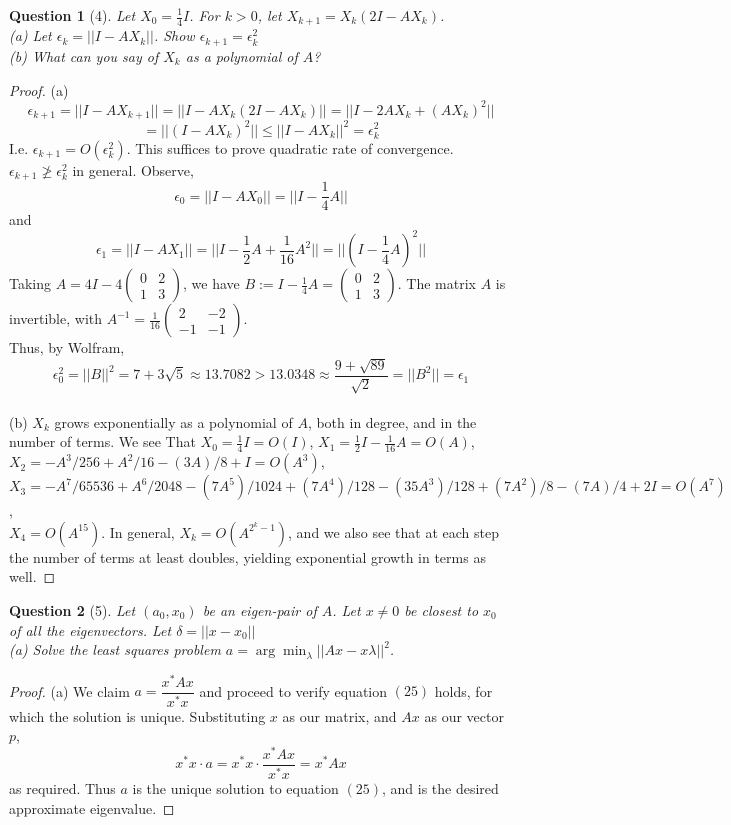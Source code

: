 \documentclass[11pt]{article}
\theoremstyle{quest}
\newtheorem*{question}{Question}
\begin{document}
\begin{question}[4]
Let $X_0 = \frac{1}{4}I$. For $k > 0$, let $X_{k+1} = X_k(2I - AX_k)$.
\\(a) Let $\epsilon_k = ||I - AX_k||$. Show $\epsilon_{k+1} = \epsilon_k^2$
\\(b) What can you say of $X_k$ as a polynomial of $A$?
\end{question}
\begin{proof}
(a) $$\epsilon_{k+1} = ||I - AX_{k+1}|| = ||I - AX_k(2I-AX_k)|| = ||I - 2AX_k + (AX_k)^2||$$ $$= ||(I - AX_k)^2|| \le ||I - AX_k||^2 = \epsilon_k^2$$
I.e. $\epsilon_{k+1} = O(\epsilon_k^2)$. This suffices to prove quadratic rate of convergence.
\\$\epsilon_{k+1} \not\ge \epsilon_k^2$ in general. Observe, $$\epsilon_0 = ||I - AX_0|| = ||I - \frac{1}{4}A||$$and$$\epsilon_1 = ||I - AX_1|| = ||I - \frac{1}{2}A + \frac{1}{16}A^2|| = ||(I - \frac{1}{4}A)^2||$$
Taking $A = 4I - 4 \begin{pmatrix}
0 & 2 \\
1 & 3
\end{pmatrix}$, we have $B := I - \frac{1}{4}A = \begin{pmatrix}
0 & 2 \\
1 & 3
\end{pmatrix}$. The matrix $A$ is invertible, with $A^{-1} = \frac{1}{16}\begin{pmatrix}
2 & -2 \\
-1 & -1
\end{pmatrix}$.
\\Thus, by Wolfram, $$\epsilon_0^2 = ||B||^2 = 7 + 3\sqrt{5} \approx 13.7082 > 13.0348 \approx \frac{9 + \sqrt{89}}{\sqrt{2}} = ||B^2|| = \epsilon_1$$
\\(b) $X_k$ grows exponentially as a polynomial of $A$, both in degree, and in the number of terms. We see That $X_0 = \frac{1}{4}I = O(I)$, $X_1 = \frac{1}{2}I - \frac{1}{16}A = O(A)$, \\$X_2 = -A^3/256 + A^2/16 - (3 A)/8 + I = O(A^3)$, \\$X_3 = -A^7/65536 + A^6/2048 - (7 A^5)/1024 + (7 A^4)/128 - (35 A^3)/128 + (7 A^2)/8 - (7 A)/4 + 2I = O(A^7)$, \\$X_4 = O(A^{15})$. In general, $X_k = O(A^{2^k-1})$, and we also see that at each step the number of terms at least doubles, yielding exponential growth in terms as well.
\end{proof}
\begin{question}[5]
Let $(a_0, x_0)$ be an eigen-pair of $A$. Let $x \ne 0$ be closest to $x_0$ of all the eigenvectors. Let $\delta = ||x - x_0||$
\\(a) Solve the least squares problem $a = \arg\min_\lambda ||Ax - x
\lambda||^2$.
\end{question}
\begin{proof}
(a) We claim $a = \dfrac{x^*Ax}{x^*x}$ and proceed to verify equation $(25)$ holds, for which the solution is unique. Substituting $x$ as our matrix, and $Ax$ as our vector $p$,
$$x^*x \cdot a = x^*x \cdot \dfrac{x^*Ax}{x^*x} = x^*Ax$$
as required. Thus $a$ is the unique solution to equation $(25)$, and is the desired approximate eigenvalue.
\end{proof}
\end{document}
